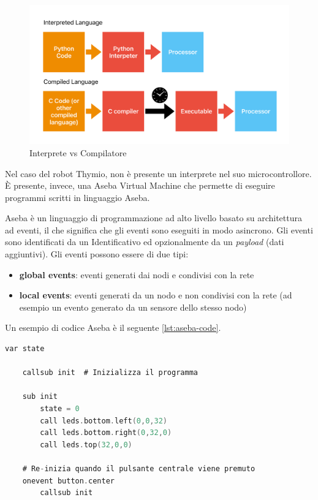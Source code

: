 \documentclass[12pt,a4paper,openright,twoside]{book}
\begin{document}
\begin{figure}
    \centering
    \includegraphics[width=.8\linewidth]{figures/interpreter-compiler.pdf}
    \caption{Interprete vs Compilatore}
    \label{fig:thymio}
\end{figure}

Nel caso del robot Thymio, non è presente un interprete nel suo microcontrollore. È presente, invece, una Aseba Virtual Machine che permette di eseguire programmi scritti in linguaggio Aseba. 

Aseba è un linguaggio di programmazione ad alto livello basato su architettura ad eventi, il che significa che gli eventi sono eseguiti in modo asincrono. Gli eventi sono identificati da un Identificativo ed opzionalmente da un \textit{payload} (dati aggiuntivi). 
Gli eventi possono essere di due tipi:
\begin{itemize}
    \item \textbf{global events}: eventi generati dai nodi e condivisi con la rete
    \item \textbf{local events}: eventi generati da un nodo e non condivisi con la rete (ad esempio un evento generato da un sensore dello stesso nodo)
\end{itemize}

Un esempio di codice Aseba è il seguente \cref{lst:aseba-code}.
\begin{lstlisting}[language=C, label={lst:aseba-code}, caption={Esempio di codice Aseba con eventi}]
    var state

    callsub init  # Inizializza il programma

    sub init
        state = 0
        call leds.bottom.left(0,0,32)
        call leds.bottom.right(0,32,0)
        call leds.top(32,0,0)

    # Re-inizia quando il pulsante centrale viene premuto
    onevent button.center
        callsub init
\end{lstlisting}
\end{document}
